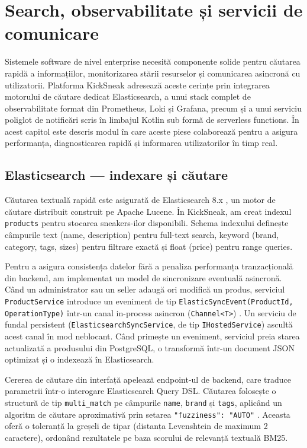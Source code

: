\chapter{Search, observabilitate și servicii de comunicare}

Sistemele software de nivel enterprise necesită componente solide pentru căutarea rapidă a informațiilor, monitorizarea stării resurselor și comunicarea asincronă cu utilizatorii. Platforma KickSneak adresează aceste cerințe prin integrarea motorului de căutare dedicat Elasticsearch, a unui stack complet de observabilitate format din Prometheus, Loki și Grafana, precum și a unui serviciu poliglot de notificări scris în limbajul Kotlin sub formă de serverless functions. În acest capitol este descris modul în care aceste piese colaborează pentru a asigura performanța, diagnosticarea rapidă și informarea utilizatorilor în timp real.

\section{Elasticsearch --- indexare și căutare}

Căutarea textuală rapidă este asigurată de Elasticsearch 8.x \cite{elasticsearch2026search}, un motor de căutare distribuit construit pe Apache Lucene. În KickSneak, am creat indexul \texttt{products} pentru stocarea sneakers-ilor disponibili. Schema indexului definește câmpurile text (name, description) pentru full-text search, keyword (brand, category, tags, sizes) pentru filtrare exactă și float (price) pentru range queries.

Pentru a asigura consistența datelor fără a penaliza performanța tranzacțională din backend, am implementat un model de sincronizare eventuală asincronă. Când un administrator sau un seller adaugă ori modifică un produs, serviciul \texttt{ProductService} introduce un eveniment de tip \texttt{ElasticSyncEvent(ProductId, OperationType)} într-un canal in-process asincron (\texttt{Channel<T>}) \cite{ms2026channels}. Un serviciu de fundal persistent (\texttt{ElasticsearchSyncService}, de tip \texttt{IHostedService}) ascultă acest canal în mod neblocant. Când primește un eveniment, serviciul preia starea actualizată a produsului din PostgreSQL, o transformă într-un document JSON optimizat și o indexează în Elasticsearch.

Cererea de căutare din interfață apelează endpoint-ul de backend, care traduce parametrii într-o interogare Elasticsearch Query DSL. Căutarea folosește o structură de tip \texttt{multi\_match} pe câmpurile \texttt{name}, \texttt{brand} și \texttt{tags}, aplicând un algoritm de căutare aproximativă prin setarea \texttt{"fuzziness": "AUTO"} \cite{elasticsearch2026search}. Aceasta oferă o toleranță la greșeli de tipar (distanța Levenshtein de maximum 2 caractere), ordonând rezultatele pe baza scorului de relevanță textuală BM25.

